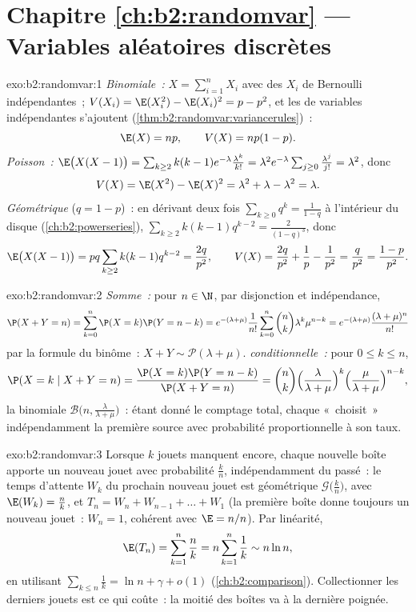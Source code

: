 \section*{Chapitre \ref{ch:b2:randomvar} --- Variables aléatoires discrètes}

\begin{solution}{exo:b2:randomvar:1}
\emph{Binomiale~:} $X = \sum_{i=1}^n X_i$ avec des $X_i$ de Bernoulli
indépendantes~; $V(X_i) = \E(X_i^2) - \E(X_i)^2 = p - p^2$, et les 
de variables indépendantes s'ajoutent
(\cref{thm:b2:randomvar:variancerules})~:
\[
\E(X) = np, \qquad V(X) = np(1-p) .
\]
\emph{Poisson~:} $\E\bigl(X(X-1)\bigr) =
\sum_{k\geq2}k(k-1)e^{-\lambda}\frac{\lambda^k}{k!} = \lambda^2
e^{-\lambda}\sum_{j\geq0}\frac{\lambda^j}{j!} = \lambda^2$, donc
\[
V(X) = \E(X^2) - \E(X)^2
= \lambda^2 + \lambda - \lambda^2 = \lambda .
\]
\emph{Géométrique} ($q = 1 - p$)~: en dérivant deux fois
$\sum_{k\geq0}q^k = \frac{1}{1-q}$ à l'intérieur du disque
(\cref{ch:b2:powerseries}), $\sum_{k\geq2}k(k-1)q^{k-2} =
\frac{2}{(1-q)^3}$, donc
\[
\E\bigl(X(X-1)\bigr) = pq\sum_{k\geq2}k(k-1)q^{k-2}
= \frac{2q}{p^2},
\qquad
V(X) = \frac{2q}{p^2} + \frac1p - \frac{1}{p^2}
= \frac{q}{p^2} = \frac{1-p}{p^2} .
\]
\end{solution}

\begin{solution}{exo:b2:randomvar:2}
\emph{Somme~:} pour $n \in \N$, par disjonction et indépendance,
\[
\P(X + Y = n)
= \sum_{k=0}^n \P(X = k)\P(Y = n - k)
= e^{-(\lambda + \mu)}\frac{1}{n!}
\sum_{k=0}^n \binom nk \lambda^k\mu^{n-k}
= e^{-(\lambda+\mu)}\frac{(\lambda + \mu)^n}{n!}
\]
par la formule du binôme~: $X + Y \sim \mathcal{P}(\lambda + \mu)$.
\emph{ conditionnelle~:} pour $0 \leq k \leq n$,
\[
\P(X = k \mid X + Y = n)
= \frac{\P(X = k)\P(Y = n - k)}{\P(X + Y = n)}
= \binom nk
\Bigl(\frac{\lambda}{\lambda+\mu}\Bigr)^{k}
\Bigl(\frac{\mu}{\lambda+\mu}\Bigr)^{n-k} ,
\]
la  binomiale $\mathcal{B}\bigl(n,
\frac{\lambda}{\lambda+\mu}\bigr)$~: étant donné le comptage total, chaque
 «~choisit~» indépendamment la première source avec probabilité
proportionnelle à son taux.
\end{solution}

\begin{solution}{exo:b2:randomvar:3}
Lorsque $k$ jouets manquent encore, chaque nouvelle boîte apporte un nouveau jouet
avec probabilité $\frac kn$, indépendamment du passé~: le
temps d'attente $W_k$ du prochain nouveau jouet est géométrique
$\mathcal{G}\bigl(\frac kn\bigr)$, avec $\E(W_k) = \frac nk$, et
$T_n = W_n + W_{n-1} + \dots + W_1$ (la première boîte donne toujours un nouveau
jouet~: $W_n = 1$, cohérent avec $\E = n/n$). Par linéarité,
\[
\E(T_n) = \sum_{k=1}^n \frac nk = n\sum_{k=1}^n\frac1k
\sim n\ln n ,
\]
en utilisant $\sum_{k\leq n}\frac1k = \ln n + \gamma + o(1)$
(\cref{ch:b2:comparison}). Collectionner les derniers jouets est ce qui
coûte~: la moitié des boîtes va à la dernière poignée.
\end{solution}


